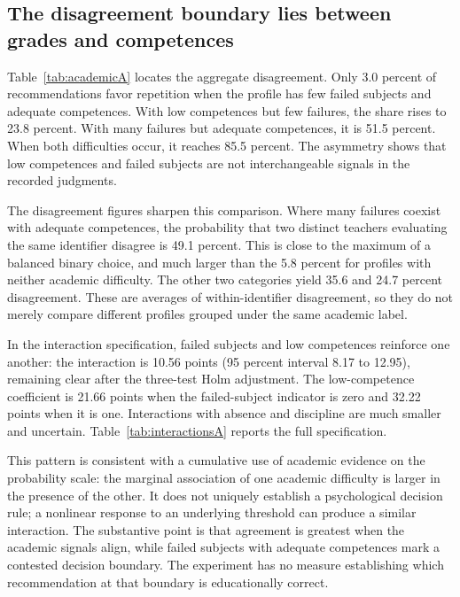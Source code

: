 \subsection{The disagreement boundary lies between grades and competences}
\begin{addition}
Table~\ref{tab:academicA} locates the aggregate disagreement. Only 3.0 percent of recommendations favor repetition when the profile has few failed subjects and adequate competences. With low competences but few failures, the share rises to 23.8 percent. With many failures but adequate competences, it is 51.5 percent. When both difficulties occur, it reaches 85.5 percent. The asymmetry shows that low competences and failed subjects are not interchangeable signals in the recorded judgments.
\end{addition}
\begin{addition}
The disagreement figures sharpen this comparison. Where many failures coexist with adequate competences, the probability that two distinct teachers evaluating the same identifier disagree is 49.1 percent. This is close to the maximum of a balanced binary choice, and much larger than the 5.8 percent for profiles with neither academic difficulty. The other two categories yield 35.6 and 24.7 percent disagreement. These are averages of within-identifier disagreement, so they do not merely compare different profiles grouped under the same academic label.

In the interaction specification, failed subjects and low competences reinforce one another: the interaction is 10.56 points (95 percent interval 8.17 to 12.95), remaining clear after the three-test Holm adjustment. The low-competence coefficient is 21.66 points when the failed-subject indicator is zero and 32.22 points when it is one. Interactions with absence and discipline are much smaller and uncertain. Table~\ref{tab:interactionsA} reports the full specification.

This pattern is consistent with a cumulative use of academic evidence on the probability scale: the marginal association of one academic difficulty is larger in the presence of the other. It does not uniquely establish a psychological decision rule; a nonlinear response to an underlying threshold can produce a similar interaction. The substantive point is that agreement is greatest when the academic signals align, while failed subjects with adequate competences mark a contested decision boundary. The experiment has no measure establishing which recommendation at that boundary is educationally correct.
\end{addition}

